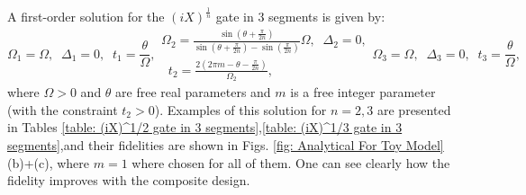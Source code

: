 \documentclass[floatfix,reprint, amsmath,amssymb,aps,superscriptaddress,nofootinbib]{revtex4-2}
\begin{document}
A first-order solution for the ${\left(iX\right)}^{\frac{1}{n}}$ gate in 3 segments is given by:
\begin{subequations}
\begin{equation}
    \Omega_1=\Omega  , \;\; \Delta_1=0  , \;\; t_1=\frac{\theta}{\Omega}  , 
\end{equation}
\begin{equation}
\begin{split}
    \Omega_2=\frac{\sin{\left(\theta+\frac{\pi}{2n} \right)}}{\sin{\left(\theta+\frac{\pi}{2n} \right)}-\sin{\left(\frac{\pi}{2n} \right)}} \Omega  , \;\; \Delta_2=0  , \\ \;\; t_2=\frac{2\left(2\pi m-\theta - \frac{\pi}{2n} \right)}{\Omega_2}  , 
\end{split}
\end{equation}
\begin{equation}
    \Omega_3=\Omega  , \;\; \Delta_3=0  , \;\; t_3=\frac{\theta}{\Omega}  , 
\end{equation}
\label{eq: (iX)^1/n gate in 3 segments}
\end{subequations}
where $\Omega>0$ and $\theta$ are free real parameters and $m$ is a free integer parameter (with the constraint $t_2>0$). Examples of this solution for $n=2,3$ are presented in Tables \ref{table: (iX)^1/2 gate in 3 segments},\ref{table: (iX)^1/3 gate in 3 segments},and their fidelities are shown in Figs. \ref{fig: Analytical For Toy Model}(b)+(c), where $m=1$ where chosen for all of them. One can see clearly how the fidelity improves with the composite design.
\end{document}
